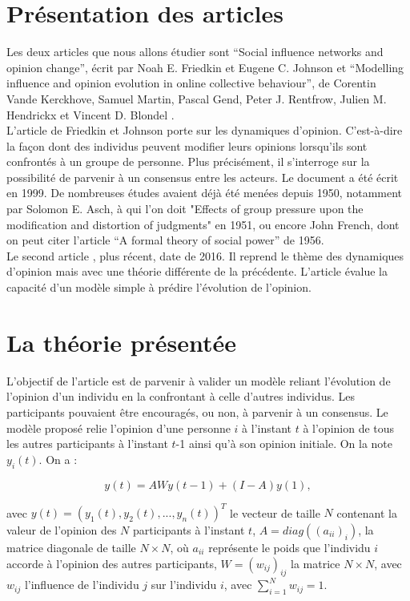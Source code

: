\documentclass{scrreprt}
\begin{document}
\section{Présentation des articles}

Les deux articles que nous allons étudier sont “Social influence networks and opinion change”, écrit par Noah E. Friedkin et Eugene C. Johnson \cite{FJ} et “Modelling influence and opinion evolution in online collective behaviour”, de Corentin Vande Kerckhove, Samuel Martin, Pascal Gend, Peter J. Rentfrow, Julien M. Hendrickx et Vincent D. Blondel \cite{VMG}.\\

L’article \cite{FJ} de Friedkin et Johnson porte sur les dynamiques d’opinion. C’est-à-dire la façon dont des individus peuvent modifier leurs opinions lorsqu’ils sont confrontés à un groupe de personne. Plus précisément, il s’interroge sur la possibilité de parvenir à un consensus entre les acteurs. Le document a été écrit en 1999. De nombreuses études avaient déjà été menées depuis 1950, notamment par Solomon E. Asch, à qui l'on doit "Effects of group pressure upon the modification and distortion of judgments" \cite{Asch} en 1951, ou encore John French, dont on peut citer l'article ``A formal theory of social power'' \cite{French} de 1956.\\

Le second article \cite{VMG}, plus récent, date de 2016. Il reprend le thème des dynamiques d’opinion mais avec une théorie différente de la précédente. L'article évalue la capacité d'un modèle simple à prédire l'évolution de l'opinion.

\section{La théorie présentée}

L’objectif de l'article \cite{FJ} est de parvenir à valider un modèle reliant l’évolution de l’opinion d’un individu en la confrontant à celle d’autres individus. Les participants pouvaient être encouragés, ou non, à parvenir à un consensus. Le modèle proposé relie l’opinion d’une personne $i$ à l’instant $t$ à l’opinion de tous les autres participants à l’instant $t$-1 ainsi qu’à son opinion initiale. On la note $y_i(t)$. On a :

\begin{equation}
\label{1}
y(t) =AWy(t-1)+(I-A)y(1), 
\end{equation}

\noindent avec $y(t)=(y_1(t), y_2(t), ... , y_n(t))^T$ le vecteur de taille $N$ contenant la valeur de l’opinion des $N$ participants à l’instant $t$, $A=diag((a_{ii})_i)$, la matrice diagonale de taille $N\times N$, où $a_{ii}$ représente le poids que l'individu $i$ accorde à l'opinion des autres participants, $W=(w_{ij})_{ij}$ la matrice $N\times N$, avec $w_{ij}$ l’influence de l’individu $j$ sur l’individu $i$, avec $\sum_{i=1}^{N} w_{ij} = 1$. \\
\end{document}
